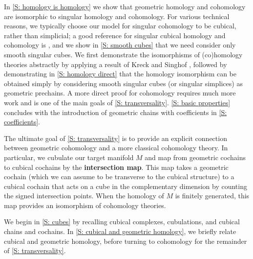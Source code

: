 In \cref{S: homology is homology} we show that geometric homology and cohomology are isomorphic to singular homology and cohomology.
For various technical reasons, we typically choose our model for singular cohomology to be cubical, rather than simplicial; a good reference for singular cubical homology and cohomology is \cite{Mas91}, and we show in \cref{S: smooth cubes} that we need consider only smooth singular cubes.
We first demonstrate the isomorphisms of (co)homology theories abstractly by applying a result of Kreck and Singhof \cite{Krec10b}, followed by demonstrating in \cref{S: homology direct} that the homology isomorphism can be obtained simply by considering smooth singular cubes (or singular simplices) as geometric prechains.
A more direct proof for cohomology requires much more work and is one of the main goals of \cref{S: transversality}.
\cref{S: basic properties} concludes with the introduction of geometric chains with coefficients in \cref{S: coefficients}.

The ultimate goal of \cref{S: transversality} is to provide an explicit connection between geometric cohomology and a more classical cohomology theory.
In particular, we cubulate our target manifold $M$ and map from geometric cochains to cubical cochains by the \textbf{intersection map}.
This map takes a geometric cochain (which we can assume to be transverse to the cubical structure) to a cubical cochain that acts on a cube in the complementary dimension by counting the signed intersection points.
When the homology of $M$ is finitely generated, this map provides an isomorphism of cohomology theories.

We begin in \cref{S: cubes} by recalling cubical complexes, cubulations, and cubical chains and cochains.
In \cref{S: cubical and geometric homology}, we briefly relate cubical and geometric homology, before turning to cohomology for the remainder of \cref{S: transversality}.

